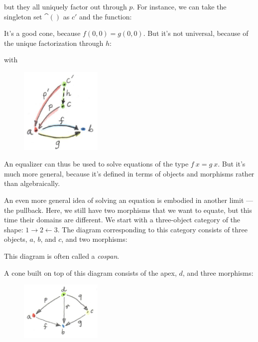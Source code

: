 
but they all uniquely factor out through $p$. For instance, we
can take the singleton set $\cat{()}$ as $c'$ and the
function:


It's a good cone, because $f (0, 0) = g (0, 0)$. But it's
not universal, because of the unique factorization through $h$:


with


\begin{figure}[H]
\centering
\includegraphics[width=0.35\textwidth]{images/equilizerlimit.jpg}
\end{figure}

\noindent
An equalizer can thus be used to solve equations of the type
$f~x = g~x$. But it's much more general, because it's defined
in terms of objects and morphisms rather than algebraically.

An even more general idea of solving an equation is embodied in another
limit --- the pullback. Here, we still have two morphisms that we want
to equate, but this time their domains are different. We start with a
three-object category of the shape:
$1\rightarrow2\leftarrow3$. The diagram corresponding to
this category consists of three objects, $a$, $b$, and
$c$, and two morphisms:


This diagram is often called a \emph{cospan}.

A cone built on top of this diagram consists of the apex, $d$,
and three morphisms:


\begin{figure}[H]
\centering
\includegraphics[width=0.35\textwidth]{images/pullbackcone.jpg}
\end{figure}

